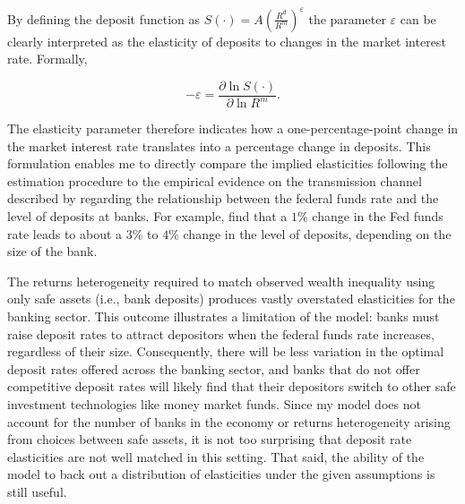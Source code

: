 \par By defining the deposit function as $S(\cdot) = A \left( \frac{R^d}{R^m} \right)^{\varepsilon}$ the parameter $\varepsilon$ can be clearly interpreted as the elasticity of deposits to changes in the market interest rate. Formally,

\[
-\varepsilon = \frac{\partial \ln S(\cdot)}{\partial \ln R^m}. 
\]

\par The elasticity parameter therefore indicates how a one-percentage-point change in the market interest rate translates into a percentage change in deposits. This formulation enables me to directly compare the implied elasticities following the estimation procedure to the empirical evidence on the transmission channel described by \cite{Drechsler2017} regarding the relationship between the federal funds rate and the level of deposits at banks. For example, \cite{Genay2004} find that a $1\%$ change in the Fed funds rate leads to about a  $3\%$ to  $4\%$ change in the level of deposits, depending on the size of the bank.

\par The returns heterogeneity required to match observed wealth inequality using only safe assets (i.e., bank deposits) produces vastly overstated elasticities for the banking sector. This outcome illustrates a limitation of the model: banks must raise deposit rates to attract depositors when the federal funds rate increases, regardless of their size. Consequently, there will be less variation in the optimal deposit rates offered across the banking sector, and banks that do not offer competitive deposit rates will likely find that their depositors switch to other safe investment technologies like money market funds. Since my model does not account for the number of banks in the economy or returns heterogeneity arising from choices between safe assets, it is not too surprising that deposit rate elasticities are not well matched in this setting. That said, the ability of the model to back out a distribution of elasticities under the given assumptions is still useful. 
